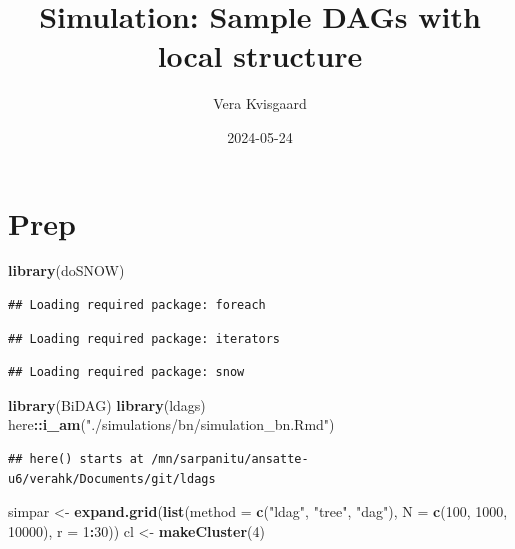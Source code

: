 \documentclass[
]{article}
\title{Simulation: Sample DAGs with local structure}
\author{Vera Kvisgaard}
\date{2024-05-24}
\newenvironment{Shaded}{\begin{snugshade}}{\end{snugshade}}
\newcommand{\AttributeTok}[1]{\textcolor[rgb]{0.13,0.29,0.53}{#1}}
\newcommand{\DecValTok}[1]{\textcolor[rgb]{0.00,0.00,0.81}{#1}}
\newcommand{\FunctionTok}[1]{\textcolor[rgb]{0.13,0.29,0.53}{\textbf{#1}}}
\newcommand{\NormalTok}[1]{#1}
\newcommand{\OtherTok}[1]{\textcolor[rgb]{0.56,0.35,0.01}{#1}}
\newcommand{\SpecialCharTok}[1]{\textcolor[rgb]{0.81,0.36,0.00}{\textbf{#1}}}
\newcommand{\StringTok}[1]{\textcolor[rgb]{0.31,0.60,0.02}{#1}}
\begin{document}
\maketitle

\hypertarget{prep}{%
\section{Prep}\label{prep}}

\begin{Shaded}
\begin{Highlighting}[]
\FunctionTok{library}\NormalTok{(doSNOW)}
\end{Highlighting}
\end{Shaded}

\begin{verbatim}
## Loading required package: foreach
\end{verbatim}

\begin{verbatim}
## Loading required package: iterators
\end{verbatim}

\begin{verbatim}
## Loading required package: snow
\end{verbatim}

\begin{Shaded}
\begin{Highlighting}[]
\FunctionTok{library}\NormalTok{(BiDAG)}
\FunctionTok{library}\NormalTok{(ldags)}
\NormalTok{here}\SpecialCharTok{::}\FunctionTok{i\_am}\NormalTok{(}\StringTok{"./simulations/bn/simulation\_bn.Rmd"}\NormalTok{)}
\end{Highlighting}
\end{Shaded}

\begin{verbatim}
## here() starts at /mn/sarpanitu/ansatte-u6/verahk/Documents/git/ldags
\end{verbatim}

\begin{Shaded}
\begin{Highlighting}[]
\NormalTok{simpar }\OtherTok{\textless{}{-}} \FunctionTok{expand.grid}\NormalTok{(}\FunctionTok{list}\NormalTok{(}\AttributeTok{method =} \FunctionTok{c}\NormalTok{(}\StringTok{"ldag"}\NormalTok{, }\StringTok{"tree"}\NormalTok{, }\StringTok{"dag"}\NormalTok{),}
                           \AttributeTok{N =} \FunctionTok{c}\NormalTok{(}\DecValTok{100}\NormalTok{, }\DecValTok{1000}\NormalTok{, }\DecValTok{10000}\NormalTok{),}
                           \AttributeTok{r =} \DecValTok{1}\SpecialCharTok{:}\DecValTok{30}\NormalTok{))}
\NormalTok{cl }\OtherTok{\textless{}{-}} \FunctionTok{makeCluster}\NormalTok{(}\DecValTok{4}\NormalTok{)}
\end{Highlighting}
\end{Shaded}
\end{document}

